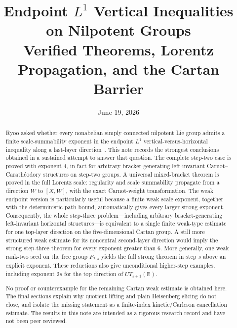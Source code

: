 \documentclass[11pt]{article}
\title{Endpoint \(L^1\) Vertical Inequalities on Nilpotent Groups\\
Verified Theorems, Lorentz Propagation, and the Cartan Barrier}
\author{}
\date{June 19, 2026}
\theoremstyle{definition}
\theoremstyle{remark}
\newcommand{\R}{\mathbb R}
\begin{document}
\maketitle

\begin{abstract}
Ryoo asked whether every nonabelian simply connected nilpotent Lie group admits a
finite scale-summability exponent in the endpoint \(L^1\) vertical-versus-horizontal
inequality along a last-layer direction~\cite{Ryoo2026}.  This note records the strongest
conclusions obtained in a sustained attempt to answer that question.  The complete step-two case is
proved with exponent \(4\), in fact for arbitrary bracket-generating left-invariant
Carnot--Carath\'eodory structures on step-two groups.  A universal mixed-bracket theorem
is proved in the full Lorentz scale: regularity and scale summability propagate from a
direction \(W\) to \([X,W]\), with the exact Carnot-weight transformation.  The weak
endpoint version is particularly useful because a finite weak scale exponent, together
with the deterministic path bound, automatically gives every larger strong exponent.
Consequently, the whole step-three problem---including arbitrary bracket-generating
left-invariant horizontal structures---is equivalent to a single finite weak-type estimate
for one top-layer direction on the five-dimensional Cartan group.  A still more
structured weak estimate for its noncentral second-layer direction would imply the
strong step-three theorem for every exponent greater than \(6\).  More generally, one
weak rank-two seed on the free group \(F_{2,s}\) yields the full strong theorem in step
\(s\) above an explicit exponent.  These reductions also give unconditional higher-step
examples, including exponent \(2s\) for the top direction of \(UT_{s+1}(\R)\).

No proof or counterexample for the remaining Cartan weak estimate is obtained here.
The final sections explain why quotient lifting and plain Heisenberg slicing do not close,
and isolate the missing statement as a finite-index kinetic/Carleson cancellation
estimate.  The results in this note are intended as a rigorous research record and have
not been peer reviewed.
\end{abstract}

\begin{center}
\end{center}
\end{document}
